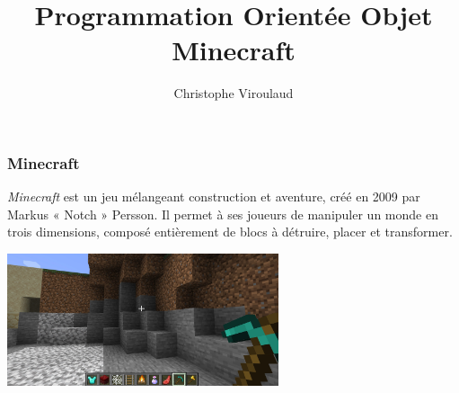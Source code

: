 \documentclass[svgnames,11pt]{beamer}
\author[]{Christophe Viroulaud}
\title{Programmation Orientée Objet\\Minecraft}
\date{\framebox{\textbf{Lang 01}}}
\institute{Terminale - NSI}
\begin{document}
\begin{frame}
    \titlepage
\end{frame}
\begin{frame}
    \frametitle{Minecraft}

    \emph{Minecraft} est un jeu mélangeant construction et aventure, créé en 2009 par Markus « Notch » Persson. Il permet à ses joueurs de manipuler un monde en trois dimensions, composé entièrement de blocs à détruire, placer et transformer.
    \begin{center}
        \centering
        \includegraphics[width=8cm]{ressources/minecraft.jpg}
    \end{center}


\end{frame}
\begin{frame}
    \frametitle{}

    \begin{center}
    \end{center}

\end{frame}
\end{document}
